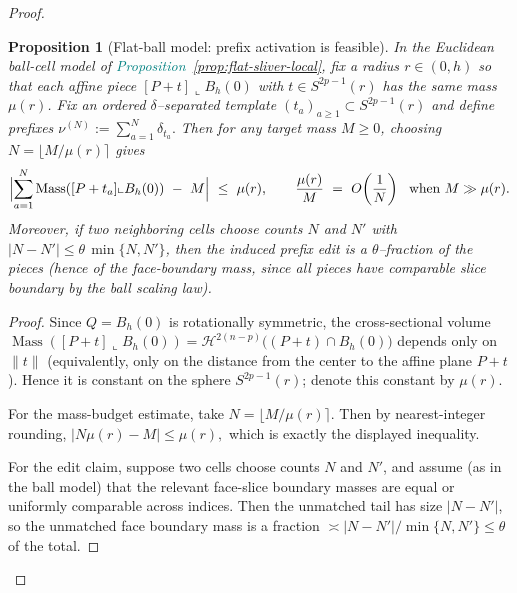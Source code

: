 \documentclass[11pt]{article}
\newcommand{\REVMZ}[1]{\textcolor{teal}{#1}}  %
\numberwithin{equation}{section}  %
\theoremstyle{plain}
\newtheorem{proposition}[theorem]{Proposition}
\theoremstyle{definition}
\theoremstyle{remark}
\DeclareMathOperator{\Mass}{Mass}
\begin{document}
\begin{proof}
\begin{proposition}[Flat-ball model: prefix activation is feasible]\label{prop:prefix-activation-flat-ball}
In the Euclidean ball-cell model of \REVMZ{Proposition~\ref{prop:flat-sliver-local}}, fix a radius $r\in(0,h)$ so that each affine piece
$[P+t]\llcorner B_h(0)$ with $t\in S^{2p-1}(r)$ has the same mass $\mu(r)$.
Fix an ordered $\delta$--separated template $(t_a)_{a\ge 1}\subset S^{2p-1}(r)$ and define prefixes
\(
\nu^{(N)}:=\sum_{a=1}^N \delta_{t_a}.
\)
Then for any target mass $M\ge 0$, choosing $N=\lfloor M/\mu(r)\rceil$ gives
\[
\Bigl|\sum_{a=1}^N \Mass([P+t_a]\llcorner B_h(0))\ -\ M\Bigr|\ \le\ \mu(r),
\qquad
\frac{\mu(r)}{M}\ =\ O\!\left(\frac1N\right)\ \text{ when }M\gg \mu(r).
\]
Moreover, if two neighboring cells choose counts $N$ and $N'$ with $|N-N'|\le \theta\,\min\{N,N'\}$, then the induced prefix edit is a $\theta$--fraction
of the pieces (hence of the face-boundary mass, since all pieces have comparable slice boundary by the ball scaling law).
\end{proposition}

\begin{proof}
Since $Q=B_h(0)$ is rotationally symmetric, the cross-sectional volume
\(
\Mass([P+t]\llcorner B_h(0))=\mathcal H^{2(n-p)}\bigl((P+t)\cap B_h(0)\bigr)
\)
depends only on $\|t\|$ (equivalently, only on the distance from the center to the affine plane $P+t$).
Hence it is constant on the sphere $S^{2p-1}(r)$; denote this constant by $\mu(r)$.

For the mass-budget estimate, take $N=\lfloor M/\mu(r)\rceil$.  Then by nearest-integer rounding,
\(
|N\mu(r)-M|\le \mu(r),
\)
which is exactly the displayed inequality.

For the edit claim, suppose two cells choose counts $N$ and $N'$, and assume (as in the ball model) that the relevant face-slice boundary masses are equal
or uniformly comparable across indices.
Then the unmatched tail has size $|N-N'|$, so the unmatched face boundary mass is a fraction $\asymp |N-N'|/\min\{N,N'\}\le \theta$ of the total.
\end{proof}



\end{proof}
\end{document}
